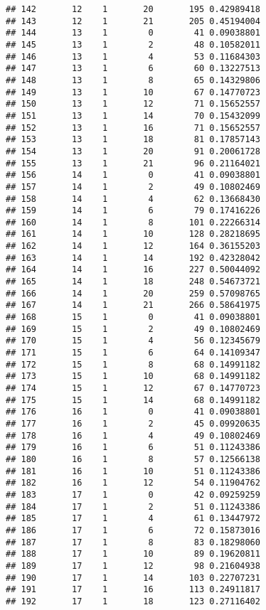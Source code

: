 \documentclass[
]{article}
\begin{document}
\begin{verbatim}
## 142       12    1       20       195 0.42989418
## 143       12    1       21       205 0.45194004
## 144       13    1        0        41 0.09038801
## 145       13    1        2        48 0.10582011
## 146       13    1        4        53 0.11684303
## 147       13    1        6        60 0.13227513
## 148       13    1        8        65 0.14329806
## 149       13    1       10        67 0.14770723
## 150       13    1       12        71 0.15652557
## 151       13    1       14        70 0.15432099
## 152       13    1       16        71 0.15652557
## 153       13    1       18        81 0.17857143
## 154       13    1       20        91 0.20061728
## 155       13    1       21        96 0.21164021
## 156       14    1        0        41 0.09038801
## 157       14    1        2        49 0.10802469
## 158       14    1        4        62 0.13668430
## 159       14    1        6        79 0.17416226
## 160       14    1        8       101 0.22266314
## 161       14    1       10       128 0.28218695
## 162       14    1       12       164 0.36155203
## 163       14    1       14       192 0.42328042
## 164       14    1       16       227 0.50044092
## 165       14    1       18       248 0.54673721
## 166       14    1       20       259 0.57098765
## 167       14    1       21       266 0.58641975
## 168       15    1        0        41 0.09038801
## 169       15    1        2        49 0.10802469
## 170       15    1        4        56 0.12345679
## 171       15    1        6        64 0.14109347
## 172       15    1        8        68 0.14991182
## 173       15    1       10        68 0.14991182
## 174       15    1       12        67 0.14770723
## 175       15    1       14        68 0.14991182
## 176       16    1        0        41 0.09038801
## 177       16    1        2        45 0.09920635
## 178       16    1        4        49 0.10802469
## 179       16    1        6        51 0.11243386
## 180       16    1        8        57 0.12566138
## 181       16    1       10        51 0.11243386
## 182       16    1       12        54 0.11904762
## 183       17    1        0        42 0.09259259
## 184       17    1        2        51 0.11243386
## 185       17    1        4        61 0.13447972
## 186       17    1        6        72 0.15873016
## 187       17    1        8        83 0.18298060
## 188       17    1       10        89 0.19620811
## 189       17    1       12        98 0.21604938
## 190       17    1       14       103 0.22707231
## 191       17    1       16       113 0.24911817
## 192       17    1       18       123 0.27116402

\end{verbatim}
\end{document}
